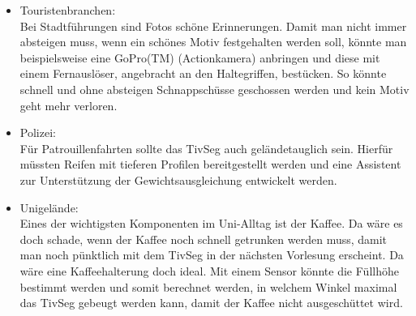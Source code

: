 \documentclass[a4paper,10pt,twoside]{report}
\begin{document}
\begin{itemize}
\item Touristenbranchen:\\
Bei Stadtführungen sind Fotos schöne Erinnerungen. Damit man nicht immer absteigen muss, wenn ein schönes Motiv festgehalten werden soll, könnte man beispielsweise eine GoPro(TM) (Actionkamera) anbringen und diese mit einem Fernauslöser, angebracht an den Haltegriffen, bestücken. So könnte schnell und ohne absteigen Schnappschüsse geschossen werden und kein Motiv geht mehr verloren.
\item Polizei: \\
Für Patrouillenfahrten sollte das TivSeg auch geländetauglich sein. Hierfür müssten Reifen mit tieferen Profilen bereitgestellt werden und eine Assistent zur Unterstützung der Gewichtsausgleichung entwickelt werden.
\item Unigelände:\\
Eines der wichtigsten Komponenten im Uni-Alltag ist der Kaffee. Da wäre es doch schade, wenn der Kaffee noch schnell getrunken werden muss, damit man noch pünktlich mit dem TivSeg in der nächsten Vorlesung erscheint. Da wäre eine Kaffeehalterung doch ideal. Mit einem Sensor könnte die Füllhöhe bestimmt werden und somit berechnet werden, in welchem Winkel maximal das TivSeg gebeugt werden kann, damit der Kaffee nicht ausgeschüttet wird. 
\end{itemize}  
\nocite{*}


\end{document}
